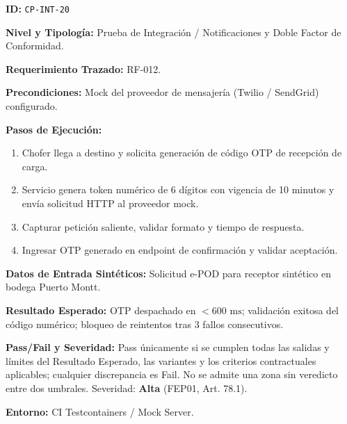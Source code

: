 \par\noindent\textbf{ID:} \texttt{C\allowbreak{}P\allowbreak{}-\allowbreak{}I\allowbreak{}N\allowbreak{}T\allowbreak{}-\allowbreak{}2\allowbreak{}0\allowbreak{}}\par
\par\noindent\textbf{Nivel y Tipología:} Prueba de Integración / Notificaciones y Doble Factor de Conformidad.\par
\par\noindent\textbf{Requerimiento Trazado:} RF-012.\par
\par\noindent\textbf{Precondiciones:} Mock del proveedor de mensajería (Twilio / SendGrid) configurado.\par
\par\noindent\textbf{Pasos de Ejecución:} \par
\begin{enumerate}
\item Chofer llega a destino y solicita generación de código OTP de recepción de carga.
\item Servicio genera token numérico de 6 dígitos con vigencia de 10 minutos y envía solicitud HTTP al proveedor mock.
\item Capturar petición saliente, validar formato y tiempo de respuesta.
\item Ingresar OTP generado en endpoint de confirmación y validar aceptación.
\end{enumerate}
\par\noindent\textbf{Datos de Entrada Sintéticos:} Solicitud e-POD para receptor sintético en bodega Puerto Montt.\par
\par\noindent\textbf{Resultado Esperado:} OTP despachado en \(< 600\text{ ms}\); validación exitosa del código numérico; bloqueo de reintentos tras 3 fallos consecutivos.\par
\par\noindent\textbf{Pass/Fail y Severidad:} Pass únicamente si se cumplen todas las salidas y límites del Resultado Esperado, las variantes y los criterios contractuales aplicables; cualquier discrepancia es Fail. No se admite una zona sin veredicto entre dos umbrales. Severidad: \textbf{Alta} (FEP01, Art. 78.1).\par
\par\noindent\textbf{Entorno:} CI Testcontainers / Mock Server.\par







